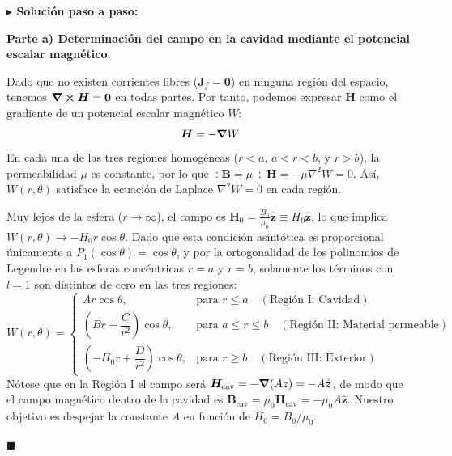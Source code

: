 \documentclass[11pt,a4paper]{book}
\newenvironment{solucion}{%
    \par\medskip\noindent\textbf{\color{blue!65!black}\Large $\blacktriangleright$ Solución paso a paso:}\par\medskip
}{%
    \hfill$\blacksquare$\par\bigskip
}
\newcommand{\zhat}{\hat{\bm{z}}}
\newcommand{\Bvec}{\bm{B}}
\newcommand{\Hvec}{\bm{H}}
\newcommand{\Jvec}{\bm{J}}
\begin{document}
\begin{solucion}
\textbf{Parte a) Determinación del campo en la cavidad mediante el potencial escalar magnético.}

Dado que no existen corrientes libres ($\Jvec_f = \bm{0}$) en ninguna región del espacio, tenemos $\curl{\Hvec} = \bm{0}$ en todas partes. Por tanto, podemos expresar $\Hvec$ como el gradiente de un potencial escalar magnético $W$:
\begin{equation}
    \Hvec = -\grad W
\end{equation}
En cada una de las tres regiones homogéneas ($r < a$, $a < r < b$, y $r > b$), la permeabilidad $\mu$ es constante, por lo que $\div{\Bvec} = \mu \div{\Hvec} = -\mu \nabla^2 W = 0$. Así, $W(r,\theta)$ satisface la ecuación de Laplace $\nabla^2 W = 0$ en cada región.

Muy lejos de la esfera ($r \to \infty$), el campo es $\Hvec_0 = \frac{B_0}{\mu_0}\zhat \equiv H_0 \zhat$, lo que implica $W(r,\theta) \to -H_0 r \cos\theta$. Dado que esta condición asintótica es proporcional únicamente a $P_1(\cos\theta) = \cos\theta$, y por la ortogonalidad de los polinomios de Legendre en las esferas concéntricas $r=a$ y $r=b$, solamente los términos con $l=1$ son distintos de cero en las tres regiones:
\begin{equation}
    W(r,\theta) = \begin{cases}
        A r \cos\theta, & \text{para } r \le a \quad (\text{Región I: Cavidad}) \\[6pt]
        \left(B r + \dfrac{C}{r^2}\right)\cos\theta, & \text{para } a \le r \le b \quad (\text{Región II: Material permeable}) \\[10pt]
        \left(-H_0 r + \dfrac{D}{r^2}\right)\cos\theta, & \text{para } r \ge b \quad (\text{Región III: Exterior})
    \end{cases}
\end{equation}
Nótese que en la Región I el campo será $\Hvec_{\text{cav}} = -\grad(A z) = -A\zhat$, de modo que el campo magnético dentro de la cavidad es $\Bvec_{\text{cav}} = \mu_0 \Hvec_{\text{cav}} = -\mu_0 A \zhat$. Nuestro objetivo es despejar la constante $A$ en función de $H_0 = B_0/\mu_0$.


\end{solucion}
\end{document}
